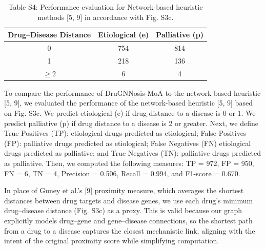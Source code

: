 \documentclass[journal,twoside,web]{ieeecolor}
\begin{document}
\begin{table}[ht]
\centering
\caption*{Table S4: Performance evaluation for Network-based heuristic methods [5, 9] in accordance with Fig. S3c.}
\label{tab:distance_distribution}
\begin{tabular}{ccc}
\toprule
{Drug–Disease Distance} & {Etiological (e)} & {Palliative (p)} \\
\midrule
0 & 754 & 814 \\
1 & 218 & 136 \\
$\geq 2$ & 6   & 4   \\
\bottomrule
\end{tabular}
\begin{tablenotes}
\item 
To compare the performance of DruGNNosis-MoA to the  network-based heuristic [5, 9], we evaluated the performance of the network-based heuristic [5, 9] based on Fig. S3c.
We predict etiological (e) if drug distance to a disease is 0 or 1.
We predict palliative (p) if drug distance to a disease is 2 or greater.
Next, we define
True Positives (TP): etiological drugs predicted as etiological;
False Positives (FP): palliative drugs predicted as etiological;
False Negatives (FN) etiological drugs predicted as palliative; and
True Negatives (TN): palliative drugs predicted as palliative.
Then, we computed the following measures:
TP = 972,
FP = 950,
FN = 6,
TN = 4,
Precision = 0.506,
Recall = 0.994, and
F1-score = 0.670.

In place of Guney et al.’s [9] proximity measure, which averages the shortest distances between drug targets and disease genes, we use each drug’s minimum drug–disease distance (Fig. S3c) as a proxy. 
This is valid because our graph explicitly models drug–gene and gene–disease connections, so the shortest path from a drug to a disease captures the closest mechanistic link, aligning with the intent of the original proximity score while simplifying computation.
\end{tablenotes}
\end{table}


\newpage


\end{document}
